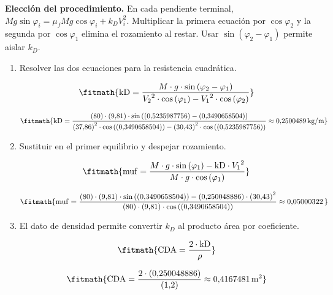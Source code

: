 \noindent\textbf{Elección del procedimiento.} En cada pendiente terminal, $Mg\sin\varphi_i=\mu_fMg\cos\varphi_i+k_DV_i^2$. Multiplicar la primera ecuación por $\cos\varphi_2$ y la segunda por $\cos\varphi_1$ elimina el rozamiento al restar. Usar $\sin(\varphi_2-\varphi_1)$ permite aislar $k_D$.

\begin{enumerate}

\item Resolver las dos ecuaciones para la resistencia cuadrática.

\[\fitmath{\mathrm{kD}=\frac{M\cdot g\cdot \sin\left(\varphi_{2}-\varphi_{1}\right)}{{V_{2}}^{2}\cdot \cos\left(\varphi_{1}\right)-{V_{1}}^{2}\cdot \cos\left(\varphi_{2}\right)}}\]

\[\fitmath{\mathrm{kD}=\frac{(80)\cdot (9{,}81)\cdot \sin\left((0{,}5235987756)-(0{,}3490658504)\right)}{{(37{,}86)}^{2}\cdot \cos\left((0{,}3490658504)\right)-{(30{,}43)}^{2}\cdot \cos\left((0{,}5235987756)\right)}\approx 0{,}2500489\,\mathrm{kg/m}}\]

\item Sustituir en el primer equilibrio y despejar rozamiento.

\[\fitmath{\mathrm{muf}=\frac{M\cdot g\cdot \sin\left(\varphi_{1}\right)-\mathrm{kD}\cdot {V_{1}}^{2}}{M\cdot g\cdot \cos\left(\varphi_{1}\right)}}\]

\[\fitmath{\mathrm{muf}=\frac{(80)\cdot (9{,}81)\cdot \sin\left((0{,}3490658504)\right)-(0{,}250048886)\cdot {(30{,}43)}^{2}}{(80)\cdot (9{,}81)\cdot \cos\left((0{,}3490658504)\right)}\approx 0{,}05000322\,}\]

\item El dato de densidad permite convertir $k_D$ al producto área por coeficiente.

\[\fitmath{\mathrm{CDA}=\frac{2\cdot \mathrm{kD}}{\rho}}\]

\[\fitmath{\mathrm{CDA}=\frac{2\cdot (0{,}250048886)}{(1{,}2)}\approx 0{,}4167481\,\mathrm{m^{2}}}\]

\end{enumerate}
